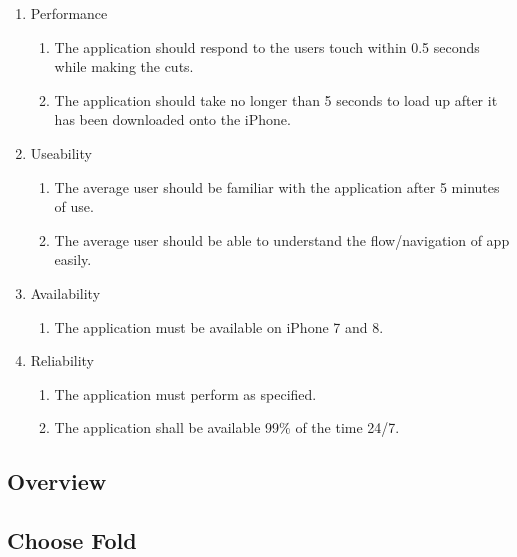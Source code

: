 \documentclass[11pt]{article}
\begin{document}
    \begin{enumerate}
        \item Performance
            \begin{enumerate}[label*=\arabic*.]
            \item The application should respond to the users touch within 0.5 seconds while making the cuts.
            \item The application should take no longer than 5 seconds to load up after it has been downloaded onto the iPhone.
            \end{enumerate}
            
        \item Useability
            \begin{enumerate}[label*=\arabic*.]
            \item The average user should be familiar with the application after 5 minutes of use. 
            \item The average user should be able to understand the flow/navigation of app easily.
            \end{enumerate}
            
        \item Availability
            \begin{enumerate}[label*=\arabic*.]
            \item The application must be available on iPhone 7 and 8.
            \end{enumerate}
            
        \item Reliability
            \begin{enumerate}[label*=\arabic*.]
            \item The application must perform as specified.
            \item The application shall be available 99\% of the time 24/7.
            \end{enumerate}
         
    \end{enumerate}
    \clearpage
    
    \subsection{Overview}
        \subsection{Choose Fold}
\end{document}
